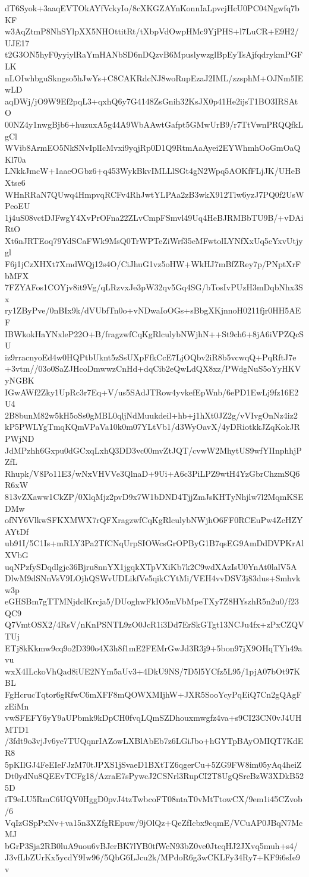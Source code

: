 dT6Syok+3aaqEVTOkAYfVckyIo/8cXKGZAYnKonnIaLpvcjHcU0PC04Ngwfq7bKF
w3AqZtmP8NhSYlpXX5NHOttitRt/tXbpVdOwpHMc9YjPHS+l7LuCR+E9H2/UJE17
t2G3ON5hyF0yyiylRaYmHANbSD6nDQzvB6MpuslywzglBpEyTsAjfqdrykmPGFLK
nLOIwhbguSkngso5hJwYs+C8CAKRdcNJ8woRupEzaJ2IML/zzsphM+OJNm5IEwLD
aqDWj/jO9W9Ef2pqL3+qxhQ6y7G4148ZsGnih32KsJX0p41He2ijsT1BO3IRSAtO
00NZ4y1nwgBjb6+huzuxA5g44A9WbAAwtGafpt5GMwUrB9/r7TtVwnPRQQfkLgCl
WVib8ArmEO5NkSNvIplIcMvxi9yqjRp0D1Q9RtmAaAyei2EYWhmhOoGmOaQKl70a
LNkkJmcW+1aaeOGbz6+q453WykBkvIMLLlSGt4gN2Wpq5AOKfFLjJK/UHeBXtse6
WHnRRaN7QUwq4HmpvqRCFv4RhJwtYLPAa2zB3wkX912Tlw6yzJ7PQ0f2UsWPeoEU
1j4uS08vctDJFwgY4XvPrOFna22ZLvCmpFSmvl49Uq4HeBJRMBbTU9B/+vDAiRtO
Xt6nJRTEoq79YdSCaFWk9MsQ0TrWPTeZiWrf35eMFwtolLYNfXxUq5cYxvUtjygl
F6j1jCzXHXt7XmdWQj12s4O/CiJhuG1vz5oHW+WkHJ7mBfZRey7p/PNptXrFbMFX
7FZYAFos1COYjv8it9Vg/qLRzvxJe3pW32qv5Gq4SG/bTosIvPUzH3mDqbNhx3Sx
ry1ZByPve/0nBIx9k/dVUbfTn0o+vNDwaIoOGs+sBbgXKjnnoH0211fjr0HH5AEF
IBWkokHaYNxleP22O+B/fragzwfCqKgRlculybNWjhN++St9ch6+8jA6iVPZQcSU
iz9rracnyoEd4w0HQPtbUknt5zSsUXpFfkCcE7LjOQbv2iR8b5vcwqQ+PqRftJ7e
+3vtm//03o0SaZJHcoDmwwzCnHd+dqCib2eQwLdQX8xz/PWdgNuS5oYyHKVyNGBK
IGwAWf2Zky1UpRc3r7Eq+V/us5SAdJTRow4yvkefEpWnb/6ePD1EwLj9fz16E2U4
2B8bunM82w5kH5oSs0gMBL0qljNdMuukdeil+hb+j1hXt0JZ2g/vVIvgOnNz4iz2
kP5PWLYgTmqKQmVPaVa10k0m07YLtVb1/d3WyOavX/4yDRiotkkJZqKokJRPWjND
JdMPzhh6Gxpu0dGCxqLxhQ3DD3vc00mvZtJQT/cvwW2MhytUS9wfYIInphhjPZfL
Rhupk/V8Po11E3/wNxVHVVe3QlnaD+9Ui+A6c3PiLPZ9wtH4YzGbrChzmSQ6R6xW
813vZXaww1CkZP/0XlqMjz2pvD9x7W1bDND4TjjZmJsKHTyNhjlw7l2MqmKSEDMw
ofNY6VlkwSFKXMWX7rQFXragzwfCqKgRlculybNWjhO6FF0RCEuPw4ZcHZYAYtDf
ub91I/5C1Is+mRLY3Pa2TfCNqUrpSIOWcsGrOPByG1B7qsEG9AmDdDVPKrAlXVbG
uqNPzfySDqdlgjc36Bjru8nnYX1jgqkXTpVXiKb7k2C9wdXAzIsU0YnAt0lalV5A
DlwM9dSNnVsV9LOjhQSWvUDLikfVe5qikCYtMi/VEH4vvDSV3j83dus+Smhvkw3p
eGHSBm7gTTMNjdclKrcja5/DUoghwFkIO5mVbMpeTXy7Z8HYszhR5n2u0/f23QC9
Q7VmtOSX2/4RsV/nKnPSNTL9zO0JcR1i3Dd7ErSkGTgt13NCJu4fx+zPxCZQVTUj
ETj8kKkmw9cq9o2D390o4X3h8f1mE2FEMrGwJd3R3j9+5bon97jX9OHqTYh49avu
wxX4ILckoVhQad8iUE2NYm5aUv3+4DkU9NS/7D5l5YCfz5L95/1pjA07bOt97KBL
FgHcrucTqtor6gRfwC6mXFF8mQOWXMIjhW+JXR5SooYcyPqEiQ7Cn2gQAgFzEiMn
vwSFEFY6yY9aUPbmk9kDpCH0fvqLQmSZDhouxmwgfz4va+s9CI23CN0vJ4UHMTD1
/3fdt9o3vjJv6ye7TUQqnrIAZowLXBlAbEb7z6LGiJbo+hGYTpBAyOMIQT7KdER8
5pKIlGJ4FeEIeFJzM70tJPXS1jSvaeD1BXtTZ6qgerCu+5ZG9FW8im05yAq4heiZ
Dt0ydNu8QEEvTCFg18/AzraE7sPywcJ2CSNrl3RupCI2T8UgQSreBzW3XDkB525D
iT9eLU5RmC6UQV0HggD0pvJ4tzTwbcoFT08ntaT0vMtTtowCX/9em1i45CZvob/6
VqIzGSpPxNv+va15n3XZfgREpuw/9jOlQz+QeZfIcbx9cqmE/VCuAP0JBqN7McMJ
bGrP3Sja2RB0luA9uou6vBJerBK7lYB0tfWcN93bZ0ve0JtcqHJ2JXvq5muh+s4/
J3vfLbZUrKx5ycdY9Iw96/5QbG6LJcu2k/MPdoR6g3wCKLFy34Ry7+KF9i6sIe9v
